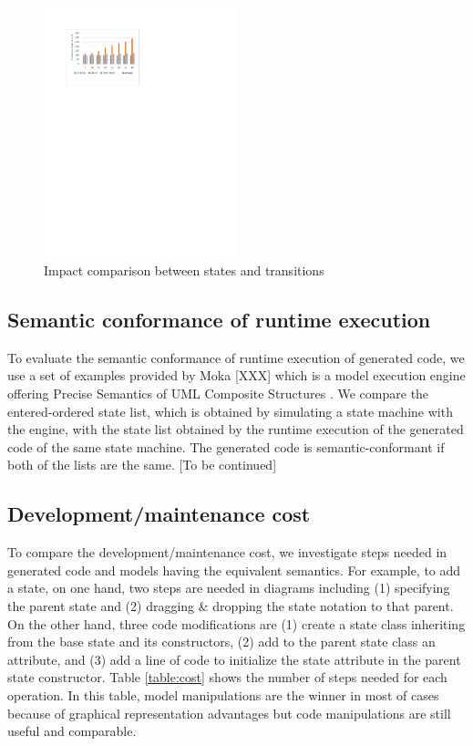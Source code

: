 \begin{figure}
\centering
\includegraphics[clip, trim=3cm 20.5cm 11cm 2.6cm, width=0.5\textwidth]{figures/graph}
\caption{Impact comparison between states and transitions} 
\label{fig:graph}
\end{figure}

\subsection{Semantic conformance of runtime execution}
To evaluate the semantic conformance of runtime execution of generated code, we use a set of examples provided by Moka [XXX] which is a model execution engine offering Precise Semantics of UML Composite Structures \cite{OMG2015}. We compare the entered-ordered state list, which is obtained by simulating a state machine with the engine, with the state list obtained by the runtime execution of the generated code of the same state machine. The generated code is semantic-conformant if both of the lists are the same. [To be continued]

\subsection{Development/maintenance cost}
\label{subsec:cost}
To compare the development/maintenance cost, we investigate steps needed in generated code and models having the equivalent semantics. For example, to add a state, on one hand, two steps are needed in diagrams including (1) specifying the parent state and (2) dragging \& dropping the state notation to that parent. On the other hand, three code modifications are (1) create a state class inheriting from the base state and its constructors, (2) add to the parent state class an attribute, and (3) add a line of code to initialize the state attribute in the parent state constructor. Table \ref{table:cost} shows the number of steps needed for each operation. In this table, model manipulations are the winner in most of cases because of graphical representation advantages but code manipulations are still useful and comparable.

